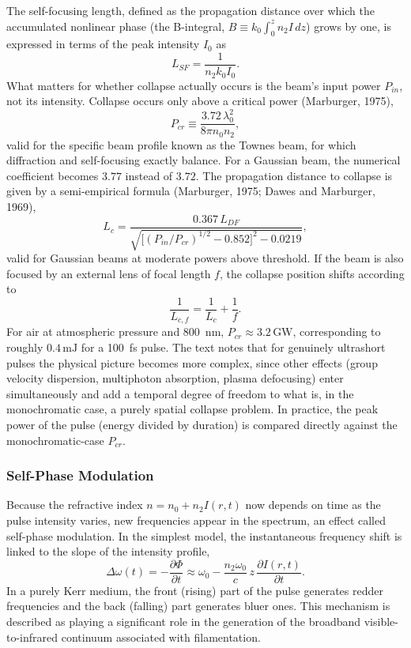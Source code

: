 \documentclass[11pt,a4paper]{article}
\begin{document}
The self-focusing length, defined as the propagation distance over which the accumulated nonlinear phase (the B-integral, $B\equiv k_0\int_0^zn_2I\,dz$) grows by one, is expressed in terms of the peak intensity $I_0$ as
\begin{equation}
L_{SF} = \frac{1}{n_2 k_0 I_0}.
\end{equation}
What matters for whether collapse actually occurs is the beam's input power $P_{in}$, not its intensity. Collapse occurs only above a critical power (Marburger, 1975),
\begin{equation}
P_{cr} \equiv \frac{3.72\,\lambda_0^2}{8\pi n_0 n_2},
\end{equation}
valid for the specific beam profile known as the Townes beam, for which diffraction and self-focusing exactly balance. For a Gaussian beam, the numerical coefficient becomes $3.77$ instead of $3.72$. The propagation distance to collapse is given by a semi-empirical formula (Marburger, 1975; Dawes and Marburger, 1969),
\begin{equation}
L_c = \frac{0.367\,L_{DF}}{\sqrt{\big[(P_{in}/P_{cr})^{1/2}-0.852\big]^2 - 0.0219}},
\end{equation}
valid for Gaussian beams at moderate powers above threshold. If the beam is also focused by an external lens of focal length $f$, the collapse position shifts according to
\begin{equation}
\frac{1}{L_{c,f}} = \frac{1}{L_c} + \frac{1}{f}.
\end{equation}
For air at atmospheric pressure and 800~nm, $P_{cr}\approx3.2\,\text{GW}$, corresponding to roughly $0.4\,\text{mJ}$ for a 100~fs pulse. The text notes that for genuinely ultrashort pulses the physical picture becomes more complex, since other effects (group velocity dispersion, multiphoton absorption, plasma defocusing) enter simultaneously and add a temporal degree of freedom to what is, in the monochromatic case, a purely spatial collapse problem. In practice, the peak power of the pulse (energy divided by duration) is compared directly against the monochromatic-case $P_{cr}$.

\subsubsection{Self-Phase Modulation}
Because the refractive index $n=n_0+n_2I(r,t)$ now depends on time as the pulse intensity varies, new frequencies appear in the spectrum, an effect called self-phase modulation. In the simplest model, the instantaneous frequency shift is linked to the slope of the intensity profile,
\begin{equation}
\Delta\omega(t) = -\frac{\partial\Phi}{\partial t} \approx \omega_0 - \frac{n_2\omega_0}{c}\,z\,\frac{\partial I(r,t)}{\partial t}.
\end{equation}
In a purely Kerr medium, the front (rising) part of the pulse generates redder frequencies and the back (falling) part generates bluer ones. This mechanism is described as playing a significant role in the generation of the broadband visible-to-infrared continuum associated with filamentation.
\end{document}
